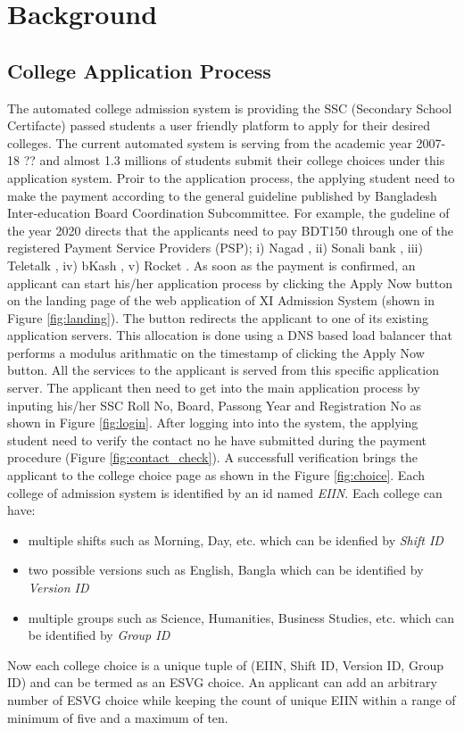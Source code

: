 \documentclass[sigconf,authordraft]{acmart}
\begin{document}
\section{Background}

\subsection{College Application Process}
The automated college admission system is providing the SSC (Secondary School Certifacte) passed students a user friendly platform to apply for their desired colleges. The current automated system is serving from the academic year 2007-18 ?? and almost 1.3 millions of students submit their college choices under this application system. 
Proir to the application process, the applying student need to make the payment according to the general guideline published by Bangladesh Inter-education Board Coordination Subcommittee. For example, the gudeline of the year 2020 directs that the applicants need to pay BDT150 through one of the registered Payment Service Providers (PSP); i) Nagad \cite{nagad}, ii) Sonali bank \cite{sonalibank}, iii) Teletalk \cite{teletalk}, iv) bKash \cite{bkash}, v) Rocket \cite{rocket}. 
As soon as the payment is confirmed, an applicant can start his/her application process by clicking the Apply Now button on the landing page of the web application of XI Admission System \cite{xiaddmissionlandingpage} (shown in Figure \ref{fig:landing}). The button redirects the applicant to one of its existing application servers. This allocation is done using a DNS based load balancer that performs a modulus arithmatic on the timestamp of clicking the Apply Now button. All the services to the applicant is served from this specific application server. The applicant then need to get into the main application process by inputing his/her SSC Roll No, Board, Passong Year and Registration No as shown in Figure \ref{fig:login}. After logging into into the system, the applying student need to verify the contact no he have submitted during the payment procedure (Figure \ref{fig:contact_check}). A successfull verification brings the applicant to the college choice page as shown in the Figure \ref{fig:choice}. 
Each college of admission system is identified by an id named \textit{EIIN}. Each college can have:
\begin{itemize}
	\item multiple shifts such as Morning, Day, etc. which can be idenfied by \textit{Shift ID} \item two possible versions such as English, Bangla which can be identified by \textit{Version ID}
	\item multiple groups such as Science, Humanities, Business Studies, etc. which can be identified by \textit{Group ID}
\end{itemize}
Now each college choice is a unique tuple of (EIIN, Shift ID, Version ID, Group ID) and can be termed as an ESVG choice. An applicant can add an arbitrary number of ESVG choice while keeping the count of unique EIIN within a range of minimum of five and a maximum of ten. 
\end{document}
